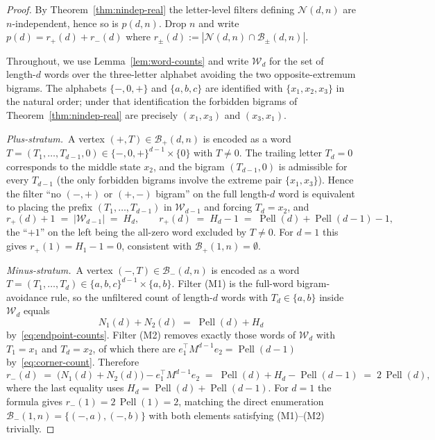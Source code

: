 \documentclass{amsart}
\theoremstyle{definition}
\theoremstyle{remark}
\DeclareMathOperator{\Pell}{Pell}
\begin{document}
\begin{proof}
By Theorem~\ref{thm:nindep-real} the letter-level filters
defining $\mathcal{N}(d, n)$ are $n$-independent, hence so is
$p(d, n)$.  Drop $n$ and write $p(d) = r_+(d) + r_-(d)$ where
$r_\pm(d) := |\mathcal{N}(d, n) \cap \mathcal{B}_\pm(d, n)|$.

Throughout, we use Lemma~\ref{lem:word-counts} and write
$\mathcal{W}_d$ for the set of length-$d$ words over the
three-letter alphabet avoiding the two opposite-extremum bigrams.
The alphabets $\{-, 0, +\}$ and $\{a, b, c\}$ are identified with
$\{x_1, x_2, x_3\}$ in the natural order; under that identification
the forbidden bigrams of Theorem~\ref{thm:nindep-real} are
precisely $(x_1, x_3)$ and $(x_3, x_1)$.

\emph{Plus-stratum.}\ A vertex $(+, T) \in \mathcal{B}_+(d, n)$
is encoded as a word $T = (T_1, \ldots, T_{d-1}, 0) \in
\{-, 0, +\}^{d-1} \times \{0\}$ with $T \neq 0$.  The trailing
letter $T_d = 0$ corresponds to the middle state $x_2$, and the
bigram $(T_{d-1}, 0)$ is admissible for every $T_{d-1}$ (the only
forbidden bigrams involve the extreme pair $\{x_1, x_3\}$).
Hence the filter ``no $(-, +)$ or $(+, -)$ bigram'' on the full
length-$d$ word is equivalent to placing the prefix
$(T_1, \ldots, T_{d-1})$ in $\mathcal{W}_{d-1}$ and forcing
$T_d = x_2$, and
\begin{equation}\label{eq:rplus}
  r_+(d) + 1 \;=\; |\mathcal{W}_{d-1}| \;=\; H_d,
  \qquad
  r_+(d) \;=\; H_d - 1 \;=\; \Pell(d) + \Pell(d-1) - 1,
\end{equation}
the ``$+1$'' on the left being the all-zero word excluded by
$T \neq 0$.  For $d = 1$ this gives $r_+(1) = H_1 - 1 = 0$,
consistent with $\mathcal{B}_+(1, n) = \emptyset$.

\emph{Minus-stratum.}\ A vertex $(-, T) \in \mathcal{B}_-(d, n)$
is encoded as a word $T = (T_1, \ldots, T_d) \in
\{a, b, c\}^{d-1} \times \{a, b\}$.  Filter \textup{(M1)} is the
full-word bigram-avoidance rule, so the unfiltered count of
length-$d$ words with $T_d \in \{a, b\}$ inside $\mathcal{W}_d$
equals
\[
  N_1(d) + N_2(d) \;=\; \Pell(d) + H_d
\]
by~\eqref{eq:endpoint-counts}.  Filter \textup{(M2)} removes
exactly those words of $\mathcal{W}_d$ with $T_1 = x_1$ and
$T_d = x_2$, of which there are $e_1^\top M^{d-1} e_2 = \Pell(d-1)$
by~\eqref{eq:corner-count}.  Therefore
\begin{equation}\label{eq:rminus}
  r_-(d) \;=\; \bigl(N_1(d) + N_2(d)\bigr) - e_1^\top M^{d-1} e_2
         \;=\; \Pell(d) + H_d - \Pell(d-1)
         \;=\; 2\,\Pell(d),
\end{equation}
where the last equality uses $H_d = \Pell(d) + \Pell(d-1)$.
For $d = 1$ the formula gives $r_-(1) = 2\,\Pell(1) = 2$, matching
the direct enumeration $\mathcal{B}_-(1, n) = \{(-, a), (-, b)\}$
with both elements satisfying \textup{(M1)}--\textup{(M2)}
trivially.


\end{proof}
\end{document}
